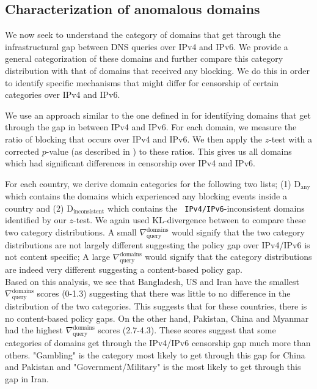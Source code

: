 \subsection{Characterization of anomalous domains}
\label{sec:infrastructure:domains}
We now seek to understand the category of domains that get through the infrastructural 
gap between DNS queries over IPv4 and IPv6. We provide a general categorization of these
domains and further compare this category distribution with that of domains that
received any blocking. We do this in order to identify specific mechanisms that might 
differ for censorship of certain categories over IPv4 and IPv6.


We use an approach similar to the one defined in  for identifying
domains that get through the gap in between IPv4 and IPv6. For each domain, we measure the ratio
of blocking that occurs over IPv4 and IPv6. We then apply the $z$-test with a corrected $p$-value
(as described in ) to these ratios. This gives us all domains
which had significant differences in censorship over IPv4 and IPv6.

For each country, we derive domain categories for the following two lists; 
(1) $\text{D}_{\text{any}}$ which contains the domains which experienced any blocking 
events inside a country and (2) $\text{D}_{\text{inconsistent}}$ which contains the {\tt
IPv4/IPv6}-inconsistent domains identified by our $z$-test. We again used KL-divergence 
between to compare these two category distributions. 
A small $\nabla_{\text{query}}^{\text{domains}}$ would signify that the two category 
distributions are not largely different suggesting the policy gap over IPv4/IPv6 
is not content specific; A large $\nabla_{\text{query}}^{\text{domains}}$
would signify that the category distributions are indeed very different 
suggesting a content-based policy gap.
\\
Based on this analysis, we see that Bangladesh, US and Iran have the smallest 
$\nabla_{\text{query}}^{\text{domains}}$ scores (0-1.3) suggesting that 
there was little to no difference in the distribution of the two categories. 
This suggests that for these countries, there is no content-based policy gaps.
On the other hand, Pakistan, China and Myanmar had the highest $\nabla_{\text{query}}^{\text{domains}}$
scores (2.7-4.3). These scores suggest that some categories of domains get through
the IPv4/IPv6 censorship gap much more than others. "Gambling" is the category most likely
to get through this gap for China and Pakistan and "Government/Military" is the most likely
to get through this gap in Iran. 
